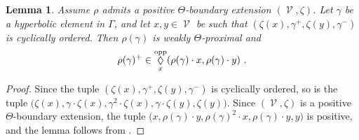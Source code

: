 \documentclass{amsart}
\theoremstyle{plain}
\newtheorem{lemma}[proposition]{Lemma}
\theoremstyle{definition}
\DeclareMathOperator{\Diam}{\lozenge}
\DeclareMathOperator{\Vc}{\mathcal{V}}
\newcommand{\opp}{\textnormal{opp}}
\newcommand{\1}{\mathbf{1}}
\begin{document}
\begin{lemma}\label{skjfghjksh}
    Assume $\rho$ admits a positive $\Theta$-boundary extension $(\Vc,\zeta)$. Let $\gamma$ be a hyperbolic element in $\Gamma$, and let $x,y\in \Vc$ be such that $(\zeta(x),\gamma^+, \zeta(y), \gamma^-)$ is cyclically ordered. Then $\rho(\gamma)$ is weakly $\Theta$-proximal and 
    \[\rho(\gamma)^+ \in \Diam_{x}^\opp(\rho(\gamma)\cdot x,\rho(\gamma)\cdot y)~.\]
\end{lemma}

\begin{proof}
    Since the tuple $(\zeta(x),\gamma^+, \zeta(y), \gamma^-)$ is cyclically ordered, so is the tuple $\big(\zeta(x), \gamma\cdot \zeta(x), \gamma^2\cdot \zeta(x), \gamma \cdot \zeta(y), \zeta(y)\big)$. Since $(\Vc,\zeta)$ is a positive $\Theta$-boundary extension, the tuple $\big(x,\rho(\gamma)\cdot y, \rho(\gamma)^2\cdot x, \rho(\gamma)\cdot y, y\big)$ is positive, and the lemma follows from .
\end{proof}
\end{document}

